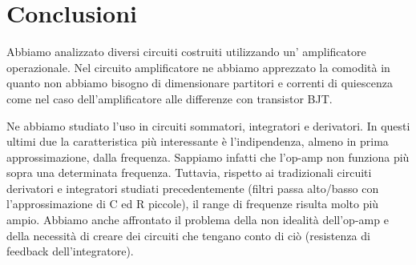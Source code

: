 \section{Conclusioni}

Abbiamo analizzato diversi circuiti costruiti utilizzando un' amplificatore operazionale. Nel circuito amplificatore ne abbiamo apprezzato la comodità in quanto non abbiamo bisogno di dimensionare partitori e correnti di quiescenza come nel caso dell'amplificatore alle differenze con transistor BJT. 

Ne abbiamo studiato l'uso in circuiti sommatori, integratori e derivatori.
In questi ultimi due la caratteristica più interessante è l'indipendenza, almeno in prima approssimazione, dalla frequenza.
Sappiamo infatti che l'op-amp non funziona più sopra una determinata frequenza.
Tuttavia, rispetto ai tradizionali circuiti derivatori e integratori studiati precedentemente (filtri passa alto/basso con l'approssimazione di C ed R piccole), il range di frequenze risulta molto più ampio.
Abbiamo anche affrontato il problema della non idealità dell'op-amp e della necessità di creare dei circuiti che tengano conto di ciò (resistenza di feedback dell'integratore).
